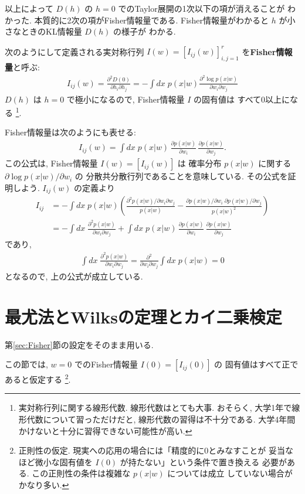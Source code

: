 \documentclass[12pt,twoside]{jarticle}
\renewcommand\d{\partial}
\theoremstyle{jplain}
\theoremstyle{jplain}
\theoremstyle{jplain}
\numberwithin{theorem}{section}
\numberwithin{equation}{section}
\numberwithin{figure}{section}
\numberwithin{table}{section}
\newcommand\secref[1]{第\ref{#1}節}
\begin{document}
以上によって $D(h)$ の $h=0$ でのTaylor展開の1次以下の項が消えることが
わかった. 本質的に2次の項がFisher情報量である.
Fisher情報量がわかると $h$ が小さなときのKL情報量 $D(h)$ の様子が
わかる.

次のようにして定義される実対称行列 $I(w)=[I_{ij}(w)]_{i,j=1}^r$
を{\bfseries Fisher情報量}と呼ぶ:
\begin{align*}
  I_{ij}(w) = \frac{\d^2 D(0)}{\d h_i\d h_j}
  = -\int dx\; p(x|w)\frac{\d^2 \log p(x|w)}{\d w_i\d w_j}
\end{align*}
$D(h)$ は $h=0$ で極小になるので, Fisher情報量 $I$ の固有値は
すべて0以上になる%
\footnote{実対称行列に関する線形代数. 線形代数はとても大事.
おそらく, 大学1年で線形代数について習っただけだと,
線形代数の習得は不十分である.
大学4年間かけないと十分に習得できない可能性が高い.}.

Fisher情報量は次のようにも表せる:
\begin{align*}
  I_{ij}(w)
  = \int dx\; p(x|w)\,\frac{\d p(x|w)}{\d w_i}\,\frac{\d p(x|w)}{\d w_j}.
\end{align*}
この公式は, Fisher情報量 $I(w)=[I_{ij}(w)]$ は
確率分布 $p(x|w)$ に関する $\d\log p(x|w)/\d w_i$ の
分散共分散行列であることを意味している.
その公式を証明しよう. $I_{ij}(w)$ の定義より
\begin{align*}
  I_{ij}
  &
  = -\int dx\;p(x|w)\left(
    \frac{\d^2 p(x|w)/\d w_i\d w_j}{p(x|w)}
    -\frac{\d p(x|w)/\d w_i\;\d p(x|w)/\d w_j}{p(x|w)^2}
  \right)
  \\ &
  = -\int dx\; \frac{\d^2 p(x|w)}{\d w_i \d w_j}
  + \int dx\; p(x|w)\,\frac{\d p(x|w)}{\d w_i}\,\frac{\d p(x|w)}{\d w_j}
\end{align*}
であり,
\begin{align*}
  \int dx\; \frac{\d^2 p(x|w)}{\d w_i \d w_j}
  =\frac{\d^2}{\d w_i \d w_j}\int dx\; p(x|w)
  =0
\end{align*}
となるので, 上の公式が成立している.


\section{最尤法とWilksの定理とカイ二乗検定}

\secref{sec:Fisher}の設定をそのまま用いる.

この節では, $w=0$ でのFisher情報量 $I(0)=[I_{ij}(0)]$ の
固有値はすべて正であると仮定する%
\footnote{正則性の仮定. 現実への応用の場合には「精度的に0とみなすことが
妥当なほど微小な固有値を $I(0)$ が持たない」という条件で置き換える
必要がある.  この正則性の条件は複雑な $p(x|w)$ については成立
していない場合がかなり多い.}.
\end{document}
